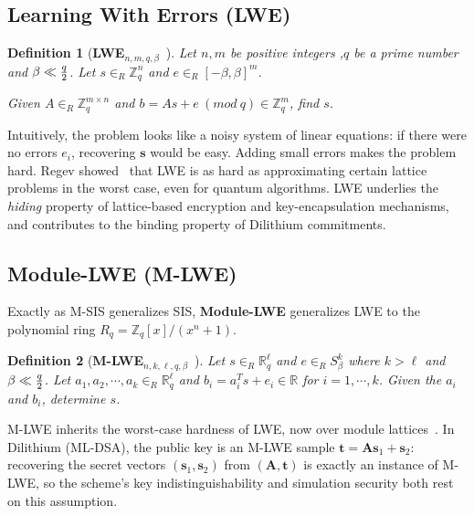 \documentclass[binding=0.6cm,oneside,noexaminfo]{sapthesis}
\newtheorem{definition}{Definition}
\begin{document}
\subsection{Learning With Errors (LWE)}
\label{lwe}

\begin{definition}[\textbf{LWE}$_{n,m,q,\beta}$~\cite{Regev2005Lattices}]
  Let $n, m$ be positive integers ,$q$ be a prime number and $\beta \ll {q\over 2}$. Let $s\in_{R} \mathbb{Z}^n_q$ and
  $e \in_{R}[-\beta,\beta]^m$.

  Given $A\in_{R} \mathbb{Z}^{m\times n}_q$ and $b = As + e\ (mod\ q)\in \mathbb{Z}^m_q$, find $s$.

\end{definition}

Intuitively, the problem looks like a noisy system of linear equations: if there were no errors $e_i$, recovering $\mathbf{s}$ would be easy. Adding small errors makes the problem hard. Regev showed~\cite{Regev2005Lattices} that LWE is as hard as approximating certain lattice problems in the worst case, even for quantum algorithms. LWE underlies the \emph{hiding} property of lattice-based encryption and key-encapsulation mechanisms, and contributes to the binding property of Dilithium commitments.

\subsection{Module-LWE (M-LWE)}
\label{mlwe}

Exactly as M-SIS generalizes SIS, \textbf{Module-LWE} generalizes LWE to the polynomial ring $R_q = \mathbb{Z}_q[x]/(x^n+1)$.

\begin{definition}[\textbf{M-LWE}$_{n,k,\ell,q,\beta}$~\cite{Langlois2015Worst}]
  Let $s\in_{R} \mathbb{R}^{\ell}_q$ and $e\in_{R}S^k_{\beta}$ where $k > \ell$ and $\beta \ll {q\over 2}$.
  Let $a_1,a_2,\cdots,a_k\in_{R}\mathbb{R}^{\ell}_q$ and $b_i = a^T_is + e_i\in \mathbb{R}$ for $i = 1,\cdots,k$.
  Given the $a_i$ and $b_i$, determine $s$.
\end{definition}

M-LWE inherits the worst-case hardness of LWE, now over module lattices~\cite{Langlois2015Worst}. In Dilithium (ML-DSA), the public key is an M-LWE sample $\mathbf{t} = \mathbf{A}\mathbf{s}_1 + \mathbf{s}_2$: recovering the secret vectors $(\mathbf{s}_1, \mathbf{s}_2)$ from $(\mathbf{A}, \mathbf{t})$ is exactly an instance of M-LWE, so the scheme's key indistinguishability and simulation security both rest on this assumption.
\end{document}
